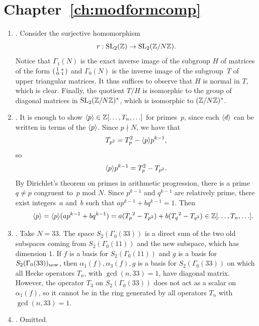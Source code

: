 \section{Chapter~\ref{ch:modformcomp}}
\begin{enumerate}
\item {}.
Consider the surjective homomorphism $$r:\operatorname{SL}_2(\mathbb{Z})\to \operatorname{SL}_2(\mathbb{Z}/N\mathbb{Z}).$$
Notice that $\Gamma_1(N)$ is the exact inverse image of the subgroup $H$ of
matrices of the form $\left( \begin{smallmatrix}1&*\\0&1\end{smallmatrix}\right)$ and $\Gamma_0(N)$
is the inverse image of the subgroup~$T$ of upper triangular matrices.
It thus suffices to observe that $H$ is normal in $T$, which is clear.
Finally, the quotient $T/H$ is isomorphic to the group of diagonal
matrices in $\operatorname{SL}_2(\mathbb{Z}/N\mathbb{Z})^*$, which is isomorphic to $(\mathbb{Z}/N\mathbb{Z})^*$.

\item {}.
It is enough to show $\langle p \rangle\in\mathbb{Z}[\ldots,T_n,\ldots]$ for
primes~$p$, since each $\langle d \rangle$ can be written in terms of the
$\langle p \rangle$. Since $p\nmid N$, we have that
\[
  T_{p^2} = T_p^2 - \langle p \rangle p^{k-1},
\]
so $$\langle p \rangle p^{k-1} = T_p^2 - T_{p^2}.$$
By Dirichlet's theorem on primes in arithmetic progression, 
there is a prime~$q\neq p$ congruent
to~$p$ mod $N$. Since $p^{k-1}$ and $q^{k-1}$ are relatively
prime, there exist integers~$a$ and~$b$ such that $a p^{k-1} + b
q^{k-1} = 1$. Then
$$
\qquad\langle p \rangle=\langle p \rangle(a p^{k-1} + b q^{k-1})
       = a({T_p}^2-T_{p^2}) + b({T_q}^2-T_{q^2})
       \in \mathbb{Z}[\ldots, T_n,\ldots].
$$

\item {}.
Take $N=33$. The space $S_2(\Gamma_0(33))$ is a direct
sum of the two old subspaces coming from $S_2(\Gamma_0(11))$
and the new subspace, which has dimension $1$.
If $f$ is a basis for $S_2(\Gamma_0(11))$ and
$g$ is a basis for $S_2(\Gamma_0(33))_{\operatorname{new}}$,
then $\alpha_1(f), \alpha_3(f), g$ is a basis
for $S_2(\Gamma_0(33))$ on which all Hecke
operators $T_n$, with $\gcd(n,33)=1$, have
diagonal matrix.
However, the operator
$T_3$ on $S_2(\Gamma_0(33))$ does
not act as a scalar on $\alpha_1(f)$,
so it cannot be in the ring generated
by all operators $T_n$ with $\gcd(n,33)=1$.

\item {}. Omitted.

\end{enumerate}

